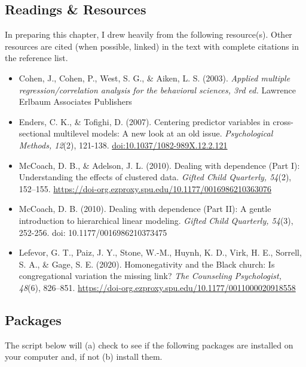 \documentclass[
  english,
]{book}
\providecommand{\tightlist}{%
  \setlength{\itemsep}{0pt}\setlength{\parskip}{0pt}}
\begin{document}
\hypertarget{readings-resources}{%
\subsection{Readings \& Resources}\label{readings-resources}}

In preparing this chapter, I drew heavily from the following resource(s). Other resources are cited (when possible, linked) in the text with complete citations in the reference list.

\begin{itemize}
\tightlist
\item
  Cohen, J., Cohen, P., West, S. G., \& Aiken, L. S. (2003). \emph{Applied multiple regression/correlation analysis for the behavioral sciences, 3rd ed.} Lawrence Erlbaum Associates Publishers
\item
  Enders, C. K., \& Tofighi, D. (2007). Centering predictor variables in cross-sectional multilevel models: A new look at an old issue. \emph{Psychological Methods, 12}(2), 121-138. \url{doi:10.1037/1082-989X.12.2.121}
\item
  McCoach, D. B., \& Adelson, J. L. (2010). Dealing with dependence (Part I): Understanding the effects of clustered data. \emph{Gifted Child Quarterly, 54}(2), 152--155. \url{https://doi-org.ezproxy.spu.edu/10.1177/0016986210363076}
\item
  McCoach, D. B. (2010). Dealing with dependence (Part II): A gentle introduction to hierarchical linear modeling. \emph{Gifted Child Quarterly, 54}(3), 252-256. doi: 10.1177/0016986210373475
\item
  Lefevor, G. T., Paiz, J. Y., Stone, W.-M., Huynh, K. D., Virk, H. E., Sorrell, S. A., \& Gage, S. E. (2020). Homonegativity and the Black church: Is congregational variation the missing link? \emph{The Counseling Psychologist, 48}(6), 826--851. \url{https://doi-org.ezproxy.spu.edu/10.1177/0011000020918558}
\end{itemize}

\hypertarget{packages-1}{%
\subsection{Packages}\label{packages-1}}

The script below will (a) check to see if the following packages are installed on your computer and, if not (b) install them.
\end{document}
